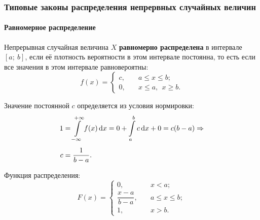 \documentclass[a4paper]{article}
\newcommand{\sleq}{\leqslant}
\newcommand{\sgeq}{\geqslant}
\newcommand{\key}[1]{{\color{Medium}\bfseries #1}}
\begin{document}
            \subsubsection{Типовые законы распределения непрервных случайных величин}

                \paragraph{Равномерное распределение}

                    Непрерывная случайная величина $X$ \key{равномерно распределена} в интервале $[a ; \: b]$, если её плотность вероятности в этом интервале постоянна, то есть если все значения в этом интервале равновероятны:
                    \begin{equation*}
                        f(x) =
                            \begin{cases}
                                c , \quad & a \sleq x \sleq b ; \\[1.0ex]
                                0 , \quad & x \sleq a , \:\: x \sgeq b .
                            \end{cases}
                    \end{equation*}

                    Значение постоянной $c$ определяется из условия нормировки:
                    \begin{equation*}
                        \begin{aligned}
                            1 & = \int\limits_{-\infty}^{+\infty} f(x) \dif x =
                                0 + \int\limits_{a}^{b} c \dif x + 0 =
                                c (b - a) \Rightarrow \\[1.0ex]
                            c & = \frac{1}{b - a} .
                        \end{aligned}
                    \end{equation*}

                    Функция распределения:
                    \begin{equation*}
                        F(x) =
                        \begin{cases}
                            0 , \quad & x < a ; \\[2.0ex]
                            \dfrac{x - a}{b - a} , \quad & a \sleq x \sleq b ; \\[2.0ex]
                            1 , \quad & x > b .
                        \end{cases}
                    \end{equation*}
\end{document}
